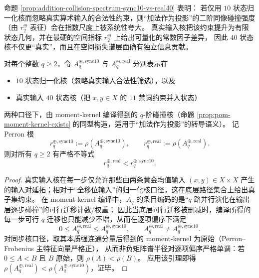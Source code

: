 \begin{remark}
\label{rem:addition-collision-spectrum-interpretation}
命题 \ref{prop:addition-collision-spectrum-sync10-vs-real40} 表明：
若仅用 $10$ 状态归一化核而忽略真实算术输入的合法性约束，则“加法作为投影”的二阶同像碰撞强度（由 \(r_2^{\oplus}\) 表征）会在指数尺度上被系统性夸大。
真实输入核把该约束提升为有限状态几何，并在最硬的空间指标 \(r_2^{\oplus}\) 上给出可量化的常数因子差异，
因此 \(40\) 状态核不仅更“真实”，而且在空间损失谱层面确有独立信息贡献。
\end{remark}

\begin{theorem}\label{thm:addition-collision-perron-drop-real-vs-sync}
对每个整数 \(q\ge 2\)，令 \(A^{\oplus,\mathrm{sync10}}_q\) 与 \(A^{\oplus,\mathrm{real}}_q\) 分别表示在
\begin{itemize}
  \item \(10\) 状态归一化核（忽略真实输入合法性筛选），以及
  \item 真实输入 \(40\) 状态核（把 \(x,y\in X\) 的 \(11\) 禁词约束并入状态）
\end{itemize}
两种口径下，由 moment-kernel 编译得到的 \(q\)-阶碰撞核（命题 \ref{prop:pom-moment-kernel-exists} 的同型构造，适用于“加法作为投影”的转导语义）。
记 Perron 根
\[
r_q^{\oplus,\mathrm{sync10}}:=\rho\!\left(A^{\oplus,\mathrm{sync10}}_q\right),
\qquad
r_q^{\oplus,\mathrm{real}}:=\rho\!\left(A^{\oplus,\mathrm{real}}_q\right).
\]
则对所有 \(q\ge 2\) 有严格不等式
\[
\boxed{\; r_q^{\oplus,\mathrm{real}}<r_q^{\oplus,\mathrm{sync10}}.\;}
\]
\end{theorem}

\begin{proof}
真实输入核在每一步仅允许那些由两条黄金均值输入 \((x,y)\in X\times X\) 产生的输入对延拓；相对于“全移位输入”的归一化核口径，这在底层路径集合上给出真子集约束。
在 moment-kernel 编译中，\(A_q\) 的条目编码的是“\(q\) 路并行演化在输出层逐步碰撞”的可行迁移计数/权重；
因此当底层可行迁移被删减时，编译所得的每一步可行 \(q\)-迁移也只能减少不增，从而在逐项偏序下满足
\[
0\le A^{\oplus,\mathrm{real}}_q \le A^{\oplus,\mathrm{sync10}}_q,
\qquad
A^{\oplus,\mathrm{real}}_q\neq A^{\oplus,\mathrm{sync10}}_q.
\]
对同步核口径，取其本质强连通分量后得到的 moment-kernel 为原始（Perron--Frobenius 主特征向量严格正），
从而非负矩阵谱半径对逐项偏序严格单调：若 \(0\le A<B\) 且 \(B\) 原始，则 \(\rho(A)<\rho(B)\)。
应用该引理即得
\(\rho(A^{\oplus,\mathrm{real}}_q)<\rho(A^{\oplus,\mathrm{sync10}}_q)\)，证毕。
\end{proof}

